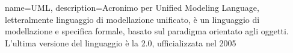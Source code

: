 {
	name=UML,
	description={Acronimo per Unified Modeling Language, letteralmente linguaggio di modellazione unificato, è un linguaggio di modellazione e specifica formale, basato sul paradigma orientato agli oggetti. L'ultima versione del linguaggio è la 2.0, ufficializzata nel 2005}
}